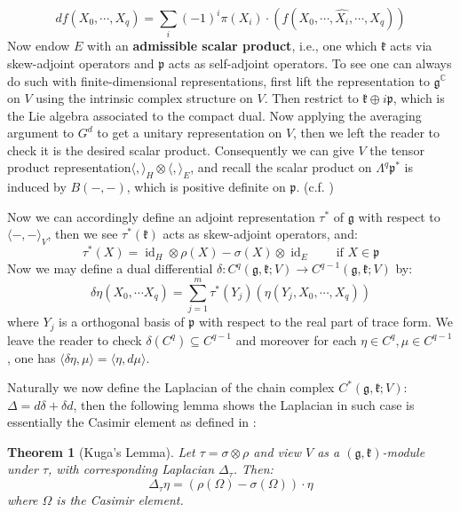 \documentclass[11pt]{report}
\theoremstyle{definition}
\theoremstyle{plain}
\newtheorem{Theo}[Def]{Theorem}
\DeclareMathOperator{\id}{id}
\newcommand{\complex}{\mathbb{C}}
\newcommand{\brac}[1]{\langle #1 \rangle}
\renewcommand{\hat}{\widehat}
\newcommand{\Lie}[1]{\mathfrak{#1}}
\begin{document}
\begin{equation}\label{borel2.1.5(5)}
df(X_0,\cdots , X_q)=\sum_i(-1)^i\pi(X_i)\cdot (f(X_0, \cdots, \hat{X_i}, \cdots, X_q))
\end{equation}
Now endow $E$ with an \textbf{admissible scalar product}, i.e., one which $\Lie{k}$ acts via skew-adjoint operators and $\Lie{p}$ acts as self-adjoint operators. To see one can always do such with finite-dimensional representations, first lift the representation to $\Lie{g}^\complex$ on $V$ using the intrinsic complex structure on $V$. Then restrict to $\Lie{k}\oplus i\Lie{p}$, which is the Lie algebra associated to the compact dual. Now applying the averaging argument to $G^d$ to get a unitary representation on $V$, then we left the reader to check it is the desired scalar product. Consequently we can give $V$ the tensor product representation$\brac{,}_H\otimes \brac{,}_E$, and recall the scalar product on $\Lambda^q\Lie{p}^*$ is induced by $B(-,-)$, which is positive definite on $\Lie{p}$. (c.f. )
\par Now we can accordingly define an adjoint representation $\tau^*$ of $\Lie{g}$ with respect to $\brac{-,-}_V$, then we see $\tau^*(\Lie{k})$ acts as skew-adjoint operators, and:
\begin{equation}
\tau^*(X)=\id_H\otimes \rho(X) - \sigma(X)\otimes \id_E \qquad \text{if $X\in \Lie{p}$}
\end{equation}
Now we may define a dual differential $\delta:C^q(\Lie{g}, \Lie{k};V)\to C^{q-1}(\Lie{g,k};V)$ by:
\begin{equation}\label{borel2.2.3(1)}
\delta\eta(X_0, \cdots X_q)=\sum_{j=1}^m \tau^*(Y_j)(\eta(Y_j,X_0,\cdots, X_q))
\end{equation}
where $Y_j$ is a orthogonal basis of $\Lie{p}$ with respect to the real part of trace form. We leave the reader to check $\delta(C^q)\subseteq C^{q-1}$ and moreover for each $\eta\in C^q, \mu\in C^{q-1}$, one has $\brac{\delta\eta, \mu}=\brac{\eta, d\mu}$.
\par Naturally we now define the Laplacian of the chain complex $C^*(\Lie{g}, \Lie{k};V)$: $\Delta=d\delta+\delta d$, then the following lemma shows the Laplacian in such case is essentially the Casimir element as defined in :
\begin{Theo}[Kuga's Lemma]\label{Kuga}
Let $\tau=\sigma\otimes \rho$ and view $V$ as a $(\Lie{g}, \Lie{k})$-module under $\tau$, with corresponding Laplacian $\Delta_\tau$. Then:
\begin{equation}
\Delta_{\tau}\eta=(\rho(\Omega)-\sigma(\Omega))\cdot \eta
\end{equation}
where $\Omega$ is the Casimir element.
\end{Theo}
\end{document}
